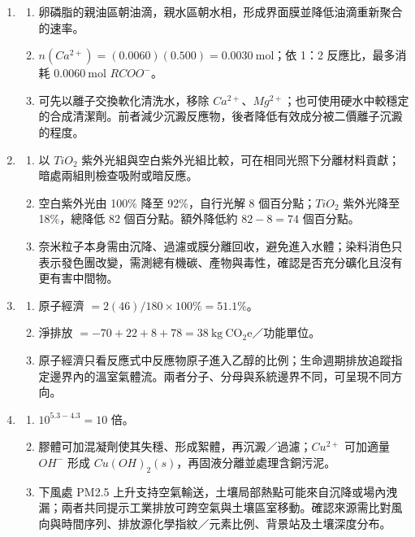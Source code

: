 \documentclass[11pt,a4paper]{article}
\providecommand{\tightlist}{%
  \setlength{\itemsep}{0pt}\setlength{\parskip}{0pt}}
\begin{document}
\begin{enumerate}
\item
  \begin{enumerate}
  \def\labelenumii{\arabic{enumii}.}
  \tightlist
  \item
    卵磷脂的親油區朝油滴，親水區朝水相，形成界面膜並降低油滴重新聚合的速率。
  \item
    \(n(Ca^{2+})=(0.0060)(0.500)=0.0030\ \mathrm{mol}\)；依 1：2 反應比，最多消耗 \(0.0060\ \mathrm{mol}\) \(RCOO^-\)。
  \item
    可先以離子交換軟化清洗水，移除 \(Ca^{2+}\)、\(Mg^{2+}\)；也可使用硬水中較穩定的合成清潔劑。前者減少沉澱反應物，後者降低有效成分被二價離子沉澱的程度。
  \end{enumerate}
\item
  \begin{enumerate}
  \def\labelenumii{\arabic{enumii}.}
  \tightlist
  \item
    以 \(TiO_2\) 紫外光組與空白紫外光組比較，可在相同光照下分離材料貢獻；暗處兩組則檢查吸附或暗反應。
  \item
    空白紫外光由 100\% 降至 92\%，自行光解 8 個百分點；\(TiO_2\) 紫外光降至 18\%，總降低 82 個百分點。額外降低約 \(82-8=74\) 個百分點。
  \item
    奈米粒子本身需由沉降、過濾或膜分離回收，避免進入水體；染料消色只表示發色團改變，需測總有機碳、產物與毒性，確認是否充分礦化且沒有更有害中間物。
  \end{enumerate}
\item
  \begin{enumerate}
  \def\labelenumii{\arabic{enumii}.}
  \tightlist
  \item
    原子經濟 \(=2(46)/180\times100\%=51.1\%\)。
  \item
    淨排放 \(=-70+22+8+78=38\ \mathrm{kg\ CO_2e}\)／功能單位。
  \item
    原子經濟只看反應式中反應物原子進入乙醇的比例；生命週期排放追蹤指定邊界內的溫室氣體流。兩者分子、分母與系統邊界不同，可呈現不同方向。
  \end{enumerate}
\item
  \begin{enumerate}
  \def\labelenumii{\arabic{enumii}.}
  \tightlist
  \item
    \(10^{5.3-4.3}=10\) 倍。
  \item
    膠體可加混凝劑使其失穩、形成絮體，再沉澱／過濾；\(Cu^{2+}\) 可加適量 \(OH^-\) 形成 \(Cu(OH)_2(s)\)，再固液分離並處理含銅污泥。
  \item
    下風處 PM2.5 上升支持空氣輸送，土壤局部熱點可能來自沉降或場內洩漏；兩者共同提示工業排放可跨空氣與土壤區室移動。確認來源需比對風向與時間序列、排放源化學指紋／元素比例、背景站及土壤深度分布。
  \end{enumerate}
\end{enumerate}
\end{document}
